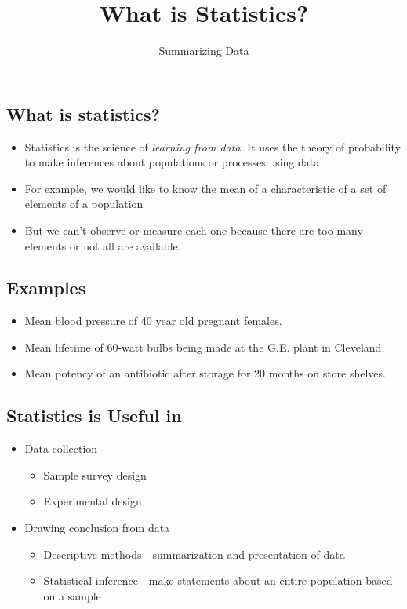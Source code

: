\documentclass[
  letterpaper,
  DIV=11,
  numbers=noendperiod]{scrartcl}
\title{What is Statistics?}
\subtitle{Summarizing Data}
\author{}
\date{}
\begin{document}
\maketitle


\subsection{What is statistics?}\label{what-is-statistics}

\begin{itemize}
\item
  Statistics is the science of {\emph{learning from data}}. It uses the
  theory of probability to make inferences about populations or
  processes using data
\item
  For example, we would like to know the mean of a characteristic of a
  set of elements of a population
\item
  But we can't observe or measure each one because there are too many
  elements or not all are available.
\end{itemize}

\subsection{Examples}\label{examples}

\begin{itemize}
\item
  Mean blood pressure of 40 year old pregnant females.
\item
  Mean lifetime of 60-watt bulbs being made at the G.E. plant in
  Cleveland.
\item
  Mean potency of an antibiotic after storage for 20 months on store
  shelves.
\end{itemize}

\subsection{Statistics is Useful in}\label{statistics-is-useful-in}

\begin{itemize}
\item
  Data collection

  \begin{itemize}
  \item
    Sample survey design
  \item
    Experimental design
  \end{itemize}
\item
  Drawing conclusion from data

  \begin{itemize}
  \item
    {Descriptive} methods - summarization and presentation of data
  \item
    {Statistical} inference - make statements about an entire population
    based on a sample
  \end{itemize}
\end{itemize}
\end{document}
